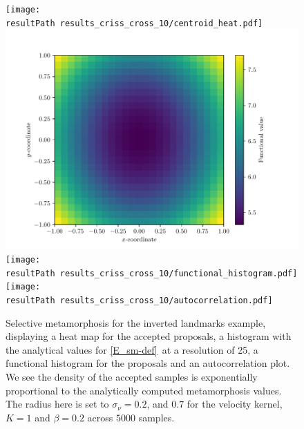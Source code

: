 \documentclass[runningheads]{llncs}
\begin{document}
\def \resultPath {\string~/Dropbox/mcmc_inverse_problems/simulations/}
\begin{figure}
\centering
\begin{minipage}{\textwidth}
  \centering
    \texttt{[image: \\resultPath results\_criss\_cross\_10/centroid\_heat.pdf]}
    \includegraphics[width=.46\textwidth]{density_criss_cross.pdf}\\[0.23cm]
    \texttt{[image: \\resultPath results\_criss\_cross\_10/functional\_histogram.pdf]}
    \texttt{[image: \\resultPath results\_criss\_cross\_10/autocorrelation.pdf]}
    \caption{Selective metamorphosis for the inverted landmarks example,
    displaying a heat map for the accepted proposals, a histogram with the
    analytical values for \eqref{E_sm-def} at a resolution of 25, a functional
    histogram for the proposals and an autocorrelation plot. We see the density
    of the accepted samples is exponentially proportional to the analytically
    computed metamorphosis values. The radius here is set to $\sigma_\nu = 0.2$,
    and $0.7$ for the velocity kernel, $K=1$ and $\beta=0.2$ across $5000$
    samples.}
    \label{fig:selective:crisscross}
\end{minipage}
\end{figure}
\end{document}
